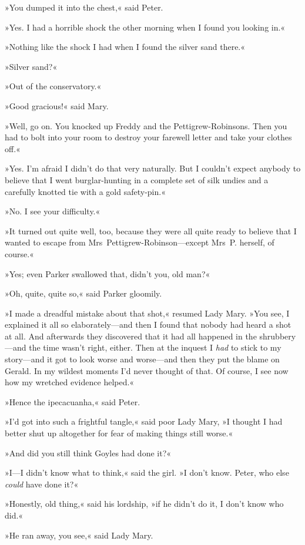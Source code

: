»You dumped it into the chest,« said Peter.

»Yes. I had a horrible shock the other morning when I found you looking in.«

»Nothing like the shock I had when I found the silver sand there.«

»Silver sand?«

»Out of the conservatory.«

»Good gracious!« said Mary.

»Well, go on. You knocked up Freddy and the Pettigrew-Robinsons. Then you had to bolt into your room to destroy your farewell letter and take your clothes off.«

»Yes. I'm afraid I didn't do that very naturally. But I couldn't expect anybody to believe that I went burglar-hunting in a complete set of silk undies and a carefully knotted tie with a gold safety-pin.«

»No. I see your difficulty.«

»It turned out quite well, too, because they were all quite ready to believe that I wanted to escape from Mrs~Pettigrew-Robinson—except Mrs~P. herself, of course.«

»Yes; even Parker swallowed that, didn't you, old man?«

»Oh, quite, quite so,« said Parker gloomily.

»I made a dreadful mistake about that shot,« resumed Lady Mary. »You see, I explained it all so elaborately—and then I found that nobody had heard a shot at all. And afterwards they discovered that it had all happened in the shrubbery—and the time wasn't right, either. Then at the inquest I \textit{had} to stick to my story—and it got to look worse and worse—and then they put the blame on Gerald. In my wildest moments I'd never thought of that. Of course, I see now how my wretched evidence helped.«

»Hence the ipecacuanha,« said Peter.

»I'd got into such a frightful tangle,« said poor Lady Mary, »I thought I had better shut up altogether for fear of making things still worse.«

»And did you still think Goyles had done it?«

»I—I didn't know what to think,« said the girl. »I don't know. Peter, who else \textit{could} have done it?«

»Honestly, old thing,« said his lordship, »if he didn't do it, I don't know who did.«

»He ran away, you see,« said Lady Mary.

